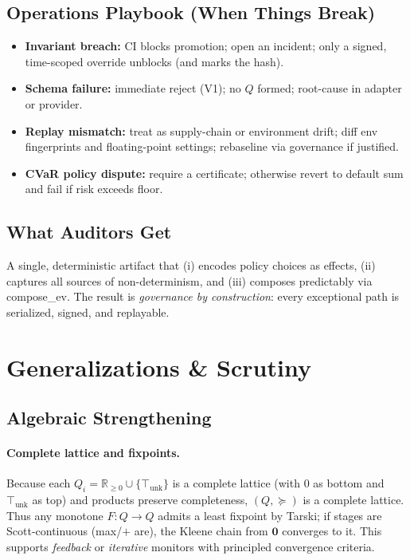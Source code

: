 \documentclass[11pt]{article}
\theoremstyle{plain}
\theoremstyle{definition}
\theoremstyle{remark}
\newcommand{\RR}{\mathbb{R}}
\def\Q{Q}%
\def\Sig{\Sigma}%
\def\composeev{compose\_ev}%
\DeclareRobustCommand{\Q}{\texorpdfstring{\ensuremath{\mathcal{Q}}}{Q}}     %
\DeclareRobustCommand{\Sig}{\texorpdfstring{\ensuremath{\Sigma}}{\Sigma}}   %
\DeclareMathOperator{\composeevOp}{compose\_ev}
\DeclareRobustCommand{\composeev}{\texorpdfstring{\ensuremath{\composeevOp}}{compose\_ev}}
\newcommand{\unk}{\top_{\mathrm{unk}}}         %
\newcommand{\geqQ}{\succeq}
\def\Q{Q}%
\def\Sig{\Sigma}%
\def\composeev{compose\_ev}%
\begin{document}
\subsection{Operations Playbook (When Things Break)}
\begin{itemize}[leftmargin=1.6em]
  \item \textbf{Invariant breach:} CI blocks promotion; open an incident; only a signed, time-scoped override unblocks (and marks the hash).
  \item \textbf{Schema failure:} immediate reject (V1); no $\Q$ formed; root-cause in adapter or provider.
  \item \textbf{Replay mismatch:} treat as supply-chain or environment drift; diff env fingerprints and floating-point settings; rebaseline via governance if justified.
  \item \textbf{CVaR policy dispute:} require a \Sig{} certificate; otherwise revert to default sum and fail if risk exceeds floor.
\end{itemize}

\subsection{What Auditors Get}
A single, deterministic artifact that (i) encodes policy choices as effects, (ii) captures all sources of non-determinism, and (iii) composes predictably via \composeev. The result is \emph{governance by construction}: every exceptional path is serialized, signed, and replayable.


\section{Generalizations \& Scrutiny}
\label{sec:generalizations}

\subsection{Algebraic Strengthening}
\paragraph{Complete lattice and fixpoints.}
Because each $Q_i=\RR_{\ge0}\cup\{\unk\}$ is a complete lattice (with $0$ as bottom and $\unk$ as top) and products preserve completeness, $(\Q,\geqQ)$ is a complete lattice. Thus any monotone $F:\Q\to\Q$ admits a least fixpoint by Tarski; if stages are Scott-continuous (max/$+$ are), the Kleene chain from $\mathbf{0}$ converges to it. This supports \emph{feedback} or \emph{iterative} monitors with principled convergence criteria.
\end{document}
